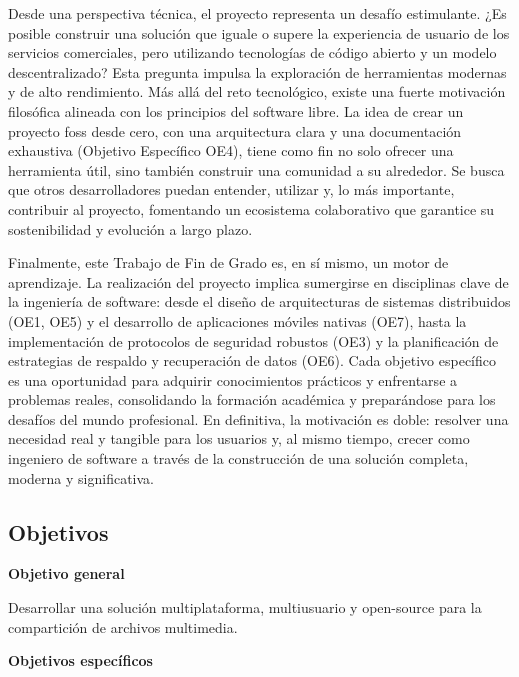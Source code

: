 Desde una perspectiva técnica, el proyecto representa un desafío estimulante. ¿Es posible construir una solución que iguale o supere la experiencia de usuario de los servicios comerciales, pero utilizando tecnologías de código abierto y un modelo descentralizado? Esta pregunta impulsa la exploración de herramientas modernas y de alto rendimiento.
Más allá del reto tecnológico, existe una fuerte motivación filosófica alineada con los principios del software libre. La idea de crear un proyecto \acrshort{foss} desde cero, con una arquitectura clara y una documentación exhaustiva (Objetivo Específico OE4), tiene como fin no solo ofrecer una herramienta útil, sino también construir una comunidad a su alrededor. Se busca que otros desarrolladores puedan entender, utilizar y, lo más importante, contribuir al proyecto, fomentando un ecosistema colaborativo que garantice su sostenibilidad y evolución a largo plazo.

Finalmente, este Trabajo de Fin de Grado es, en sí mismo, un motor de aprendizaje. La realización del proyecto implica sumergirse en disciplinas clave de la ingeniería de software: desde el diseño de arquitecturas de sistemas distribuidos (OE1, OE5) y el desarrollo de aplicaciones móviles nativas (OE7), hasta la implementación de protocolos de seguridad robustos (OE3) y la planificación de estrategias de respaldo y recuperación de datos (OE6). Cada objetivo específico es una oportunidad para adquirir conocimientos prácticos y enfrentarse a problemas reales, consolidando la formación académica y preparándose para los desafíos del mundo profesional. En definitiva, la motivación es doble: resolver una necesidad real y tangible para los usuarios y, al mismo tiempo, crecer como ingeniero de software a través de la construcción de una solución completa, moderna y significativa.

\subsection{Objetivos}

\textbf{Objetivo general}

Desarrollar una solución multiplataforma, multiusuario y open-source para la compartición de archivos multimedia.

\textbf{Objetivos específicos}

